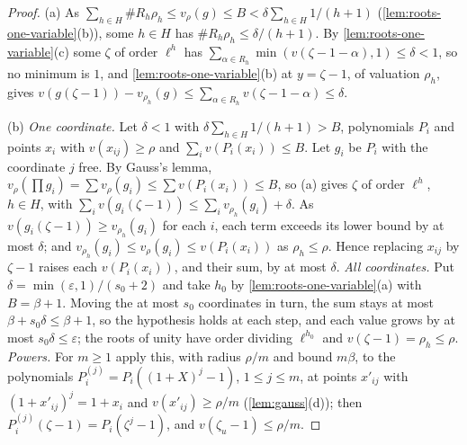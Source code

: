 \begin{proof}
(a) As $\sum_{h\in H}\#R_h\rho_h\le v_\rho(g)\le B<\delta\sum_{h\in H}1/(h+1)$ (\cref{lem:roots-one-variable}(b)), some $h\in H$ has $\#R_h\rho_h\le\delta/(h+1)$. By \cref{lem:roots-one-variable}(c) some $\zeta$ of order $\ell^h$ has $\sum_{\alpha\in R_h}\min(v(\zeta-1-\alpha),1)\le\delta<1$, so no minimum is $1$, and
\cref{lem:roots-one-variable}(b) at $y=\zeta-1$, of valuation $\rho_h$, gives $v(g(\zeta-1))-v_{\rho_h}(g)\le\sum_{\alpha\in R_h}v(\zeta-1-\alpha)\le\delta$.

(b) \emph{One coordinate.} Let $\delta<1$ with $\delta\sum_{h\in H}1/(h+1)>B$, polynomials $P_i$ and points $x_i$ with $v(x_{ij})\ge\rho$ and $\sum_iv(P_i(x_i))\le B$. Let $g_i$ be $P_i$ with the coordinate $j$ free. By Gauss's lemma, $v_\rho(\prod g_i)=\sum v_\rho(g_i)\le\sum v(P_i(x_i))\le B$, so (a) gives $\zeta$ of order $\ell^h$, $h\in H$, with
$\sum_iv(g_i(\zeta-1))\le\sum_iv_{\rho_h}(g_i)+\delta$. As $v(g_i(\zeta-1))\ge v_{\rho_h}(g_i)$ for each $i$, each term exceeds its lower bound by at most $\delta$; and $v_{\rho_h}(g_i)\le v_\rho(g_i)\le v(P_i(x_i))$ as $\rho_h\le\rho$. Hence replacing $x_{ij}$ by $\zeta-1$ raises each $v(P_i(x_i))$, and their sum, by at most $\delta$.
\emph{All coordinates.} Put $\delta=\min(\varepsilon,1)/(s_0+2)$ and take $h_0$ by \cref{lem:roots-one-variable}(a) with $B=\beta+1$. Moving the at most $s_0$ coordinates in turn, the sum stays at most $\beta+s_0\delta\le\beta+1$, so the hypothesis holds at each step, and each value grows by at most $s_0\delta\le\varepsilon$; the roots of unity have
order dividing $\ell^{h_0}$ and $v(\zeta-1)=\rho_h\le\rho$. \emph{Powers.} For $m\ge1$ apply this, with radius $\rho/m$ and bound $m\beta$, to the polynomials $P_i^{(j)}=P_i((1+X)^j-1)$, $1\le j\le m$, at points $x'_{ij}$ with $(1+x'_{ij})^j=1+x_i$ and $v(x'_{ij})\ge\rho/m$ (\cref{lem:gauss}(d)); then
$P_i^{(j)}(\zeta-1)=P_i(\zeta^j-1)$, and $v(\zeta_u-1)\le\rho/m$.
\end{proof}

